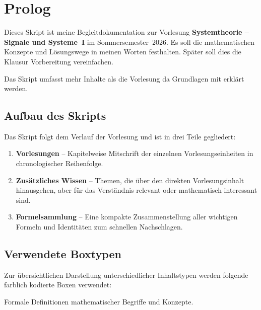 \chapter*{Prolog}

Dieses Skript ist meine Begleitdokumentation zur Vorlesung
\textbf{Systemtheorie – Signale und Systeme~I} im Sommersemester~2026.
Es soll die mathematischen Konzepte und Lösungswege in meinen Worten 
festhalten. Später soll dies die Klausur Vorbereitung vereinfachen.

\bigskip

\begin{bemerkungbox}
Das Skript umfasst mehr Inhalte als die Vorlesung da Grundlagen mit erklärt 
werden.
\end{bemerkungbox}

\bigskip

\section*{Aufbau des Skripts}

Das Skript folgt dem Verlauf der Vorlesung und ist in drei Teile gegliedert:

\begin{enumerate}
  \item \textbf{Vorlesungen} – Kapitelweise Mitschrift der einzelnen
        Vorlesungseinheiten in chronologischer Reihenfolge.
  \item \textbf{Zusätzliches Wissen} – Themen, die über den direkten
        Vorlesungsinhalt hinausgehen, aber für das Verständnis relevant
        oder mathematisch interessant sind.
  \item \textbf{Formelsammlung} – Eine kompakte Zusammenstellung aller
        wichtigen Formeln und Identitäten zum schnellen Nachschlagen.
\end{enumerate}

\section*{Verwendete Boxtypen}

Zur übersichtlichen Darstellung unterschiedlicher Inhaltstypen werden
folgende farblich kodierte Boxen verwendet:

\begin{definitionbox}[Beispiel]
  Formale Definitionen mathematischer Begriffe und Konzepte.
\end{definitionbox}


